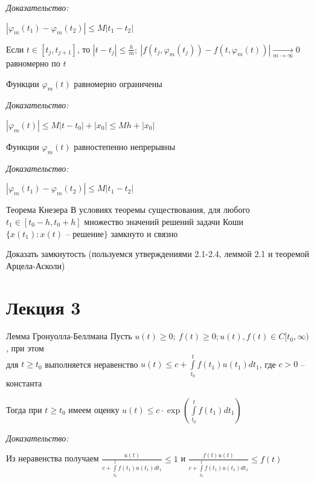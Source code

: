 \documentclass[12pt]{article}
\begin{document}
\textit{Доказательство:}

$|\varphi_m(t_1) - \varphi_m(t_2)| \leq M|t_1 - t_2|$

Если $t \in [t_j, t_{j + 1}]$, то $|t - t_j| \leq \frac{h}{m};\ |f(t_j, \varphi_m(t_j)) - f(t, \varphi_m(t))| \xrightarrow[m \to \infty]{} 0$ равномерно по $t$ 

\begin{propos}{}
    Функции $\varphi_m(t)$ равномерно ограничены 
\end{propos}

\textit{Доказательство:}

$|\varphi_m(t)| \leq M|t - t_0| + |x_0| \leq Mh + |x_0|$

\begin{propos}{}
    Функции $\varphi_m(t)$ равностепенно непрерывны
\end{propos}

\textit{Доказательство:}

$|\varphi_m(t_1) - \varphi_m(t_2)| \leq M|t_1 - t_2|$

\begin{theo}{Теорема Кнезера}
    В условиях теоремы существования, для любого $t_1 \in [t_0 - h, t_0 + h]$ множество значений решений задачи Коши $\{x(t_1) : x(t)\text{ -- решение}\}$ замкнуто и связно
\end{theo}

\begin{Exercise}{}
    Доказать замкнутость (пользуемся утверждениями 2.1-2.4, леммой 2.1 и теоремой Арцела-Асколи)
\end{Exercise}

\newpage 

\section{Лекция 3}

\begin{lem}{Лемма Гронуолла-Беллмана}
    Пусть $u(t) \geq 0;\ f(t) \geq 0; u(t), f(t) \in C[t_0, \infty)$, при этом \\
    для $t \geq t_0$ выполняется неравенство $u(t) \leq c + \int\limits_{t_0}^t f(t_1)u(t_1)dt_1$, где $c > 0$ -- константа

    Тогда при $t \geq t_0$ имеем оценку $u(t) \leq c \cdot \exp(\int\limits_{t_0}^t f(t_1)dt_1)$
\end{lem}

\textit{Доказательство:}

Из неравенства получаем $\frac{u(t)}{c + \int\limits_{t_0}^t f(t_1)u(t_1)dt_1} \leq 1$ и $\frac{f(t)u(t)}{c + \int\limits_{t_0}^t f(t_1)u(t_1)dt_1} \leq f(t)$
\end{document}
